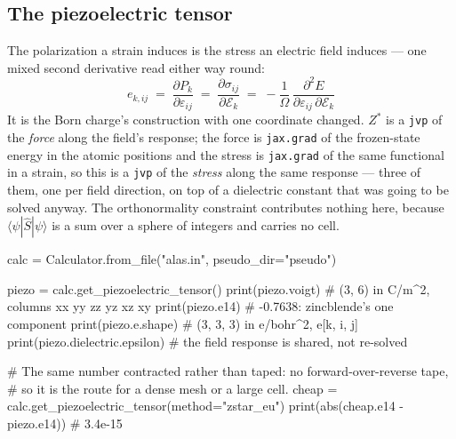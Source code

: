 \documentclass[11pt,a4paper]{article}
\newcommand{\code}[1]{\texttt{\small #1}}
\begin{document}
\subsection{The piezoelectric tensor}

The polarization a strain induces is the stress an electric field induces ---
one mixed second derivative read either way round:
\begin{equation*}
e_{k,ij} \;=\; \frac{\partial P_k}{\partial\varepsilon_{ij}}
        \;=\; \frac{\partial\sigma_{ij}}{\partial\mathcal E_k}
        \;=\; -\frac{1}{\Omega}\,
              \frac{\partial^2 E}{\partial\varepsilon_{ij}\,\partial\mathcal E_k}
\end{equation*}
It is the Born charge's construction with one coordinate changed. $Z^\ast$ is a
\code{jvp} of the \emph{force} along the field's response; the force is
\code{jax.grad} of the frozen-state energy in the atomic positions and the
stress is \code{jax.grad} of the same functional in a strain, so this is a
\code{jvp} of the \emph{stress} along the same response --- three of them, one
per field direction, on top of a dielectric constant that was going to be
solved anyway. The orthonormality constraint contributes nothing here, because
$\langle\psi|\hat S|\psi\rangle$ is a sum over a sphere of integers and carries
no cell.

\begin{pycode}
calc = Calculator.from_file("alas.in", pseudo_dir="pseudo")

piezo = calc.get_piezoelectric_tensor()
print(piezo.voigt)              # (3, 6) in C/m^2, columns xx yy zz yz xz xy
print(piezo.e14)                # -0.7638: zincblende's one component
print(piezo.e.shape)            # (3, 3, 3) in e/bohr^2, e[k, i, j]
print(piezo.dielectric.epsilon) # the field response is shared, not re-solved

# The same number contracted rather than taped: no forward-over-reverse tape,
# so it is the route for a dense mesh or a large cell.
cheap = calc.get_piezoelectric_tensor(method="zstar_eu")
print(abs(cheap.e14 - piezo.e14))   # 3.4e-15
\end{pycode}
\end{document}
